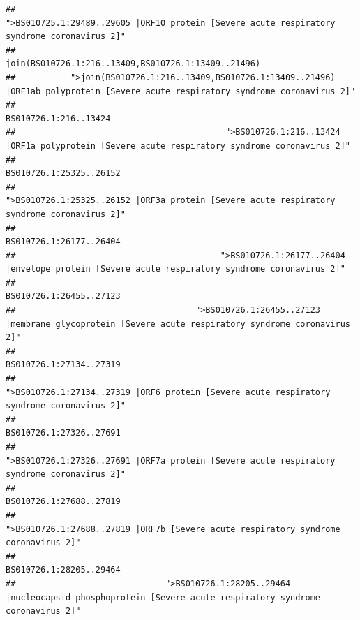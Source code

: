\documentclass[
]{article}
\begin{document}
\begin{verbatim}
##                                            ">BS010725.1:29489..29605 |ORF10 protein [Severe acute respiratory syndrome coronavirus 2]" 
##                                                                                    join(BS010726.1:216..13409,BS010726.1:13409..21496) 
##           ">join(BS010726.1:216..13409,BS010726.1:13409..21496) |ORF1ab polyprotein [Severe acute respiratory syndrome coronavirus 2]" 
##                                                                                                                  BS010726.1:216..13424 
##                                          ">BS010726.1:216..13424 |ORF1a polyprotein [Severe acute respiratory syndrome coronavirus 2]" 
##                                                                                                                BS010726.1:25325..26152 
##                                            ">BS010726.1:25325..26152 |ORF3a protein [Severe acute respiratory syndrome coronavirus 2]" 
##                                                                                                                BS010726.1:26177..26404 
##                                         ">BS010726.1:26177..26404 |envelope protein [Severe acute respiratory syndrome coronavirus 2]" 
##                                                                                                                BS010726.1:26455..27123 
##                                    ">BS010726.1:26455..27123 |membrane glycoprotein [Severe acute respiratory syndrome coronavirus 2]" 
##                                                                                                                BS010726.1:27134..27319 
##                                             ">BS010726.1:27134..27319 |ORF6 protein [Severe acute respiratory syndrome coronavirus 2]" 
##                                                                                                                BS010726.1:27326..27691 
##                                            ">BS010726.1:27326..27691 |ORF7a protein [Severe acute respiratory syndrome coronavirus 2]" 
##                                                                                                                BS010726.1:27688..27819 
##                                                    ">BS010726.1:27688..27819 |ORF7b [Severe acute respiratory syndrome coronavirus 2]" 
##                                                                                                                BS010726.1:28205..29464 
##                              ">BS010726.1:28205..29464 |nucleocapsid phosphoprotein [Severe acute respiratory syndrome coronavirus 2]" 

\end{verbatim}
\end{document}
